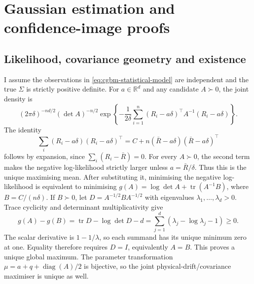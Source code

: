 \documentclass[11pt]{article}
\begin{document}
\section{Gaussian estimation and confidence-image proofs}
\label{app:cgbm-estimation}

\subsection{Likelihood, covariance geometry and existence}

I assume the observations in \eqref{eq:cgbm-statistical-model} are
independent and the true $\Sigma$ is strictly positive definite.
For $a\in\mathbb R^d$ and any candidate $A\succ0$, the joint density is
\begin{equation}
 (2\pi\delta)^{-nd/2}(\det A)^{-n/2}
 \exp\left\{-\frac{1}{2\delta}
 \sum_{i=1}^n(R_i-a\delta)^\top A^{-1}(R_i-a\delta)\right\}.
 \label{eq:cgbm-gaussian-likelihood}
\end{equation}
The identity
\begin{equation}
 \sum_i(R_i-a\delta)(R_i-a\delta)^\top
 =C+n(\bar R-a\delta)(\bar R-a\delta)^\top
 \label{eq:cgbm-scatter-decomposition}
\end{equation}
follows by expansion, since $\sum_i(R_i-\bar R)=0$.
For every $A\succ0$, the second term makes the negative log-likelihood
strictly larger unless $a=\bar R/\delta$. Thus this is the unique
maximising mean. After substituting it, minimising the negative
log-likelihood is equivalent to minimising
$g(A)=\log\det A+\operatorname{tr}(A^{-1}B)$, where $B=C/(n\delta)$.
If $B\succ0$, let $D=A^{-1/2}BA^{-1/2}$ with eigenvalues
$\lambda_1,\ldots,\lambda_d>0$. Trace cyclicity and determinant
multiplicativity give
\begin{equation}
 g(A)-g(B)=\operatorname{tr}D-\log\det D-d
 =\sum_{j=1}^d(\lambda_j-\log\lambda_j-1)\geq0.
 \label{eq:cgbm-likelihood-global-optimum}
\end{equation}
The scalar derivative is $1-1/\lambda$, so each summand has its unique
minimum zero at one. Equality therefore requires $D=I$, equivalently
$A=B$. This proves a unique global maximum. The parameter transformation
$\mu=a+q+\operatorname{diag}(A)/2$ is bijective, so the joint
physical-drift/covariance maximiser is unique as well.
\end{document}
